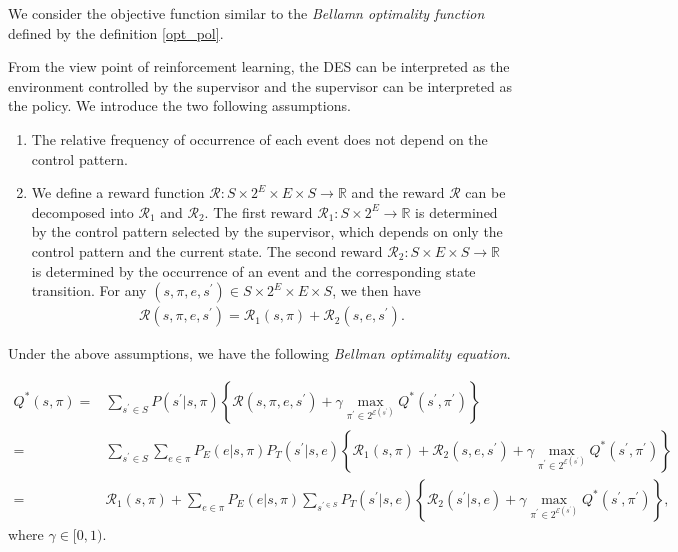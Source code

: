\documentclass[a4j,12pt,oneside,openany,english,dvipdfmx]{jsbook}
\begin{document}
We consider the objective function similar to the {\it Bellamn optimality function} defined by the definition \ref{opt_pol}.
\begin{definition}

  From the view point of reinforcement learning, the DES can be interpreted as the environment controlled by the supervisor and the supervisor can be interpreted as the policy. We introduce the two following assumptions.

  \begin{enumerate}
    \item The relative frequency of occurrence of each event does not depend on the control pattern.
    \item We define a reward function $\mathcal{R} : S \times 2^E \times E \times S \rightarrow \mathbb{R}$ and the reward $\mathcal{R}$ can be decomposed into $\mathcal{R}_1$ and $\mathcal{R}_2$. The first reward $\mathcal{R}_1 : S \times 2^E \rightarrow \mathbb{R}$ is determined by the control pattern selected by the supervisor, which depends on only the control pattern and the current state. The second reward $\mathcal{R}_2 : S \times E \times S \rightarrow \mathbb{R}$ is determined by the occurrence of an event and the corresponding state transition. For any $(s,\pi,e,s^{\prime}) \in S \times 2^E \times E \times S$, we then have
    \begin{align}
      \mathcal{R}(s,\pi,e,s^{\prime}) = \mathcal{R}_1(s,\pi) + \mathcal{R}_2(s,e,s^{\prime}).
    \end{align}
  \end{enumerate}
  Under the above assumptions, we have the following {\it Bellman optimality equation}.

  \begin{align}
    Q^{\ast}(s,\pi) = & \sum_{s^{\prime} \in S} P(s^{\prime}|s,\pi)\left \{ \mathcal{R}(s,\pi,e,s^{\prime}) + \gamma \max_{\pi^{\prime} \in 2^{\mathcal{E}(s^{\prime})}} Q^{\ast}(s^{\prime},\pi^{\prime}) \right \} \nonumber \\
    = & \sum_{s^{\prime} \in S} \sum_{e \in \pi} P_E(e|s,\pi) P_T(s^{\prime}|s,e) \left \{ \mathcal{R}_1(s,\pi) + \mathcal{R}_2(s,e,s^{\prime}) + \gamma \max_{\pi^{\prime} \in 2^{\mathcal{E}(s^{\prime})}} Q^{\ast}(s^{\prime},\pi^{\prime}) \right \} \nonumber \\
    = & \mathcal{R}_1(s,\pi) + \sum_{e \in \pi} P_E(e|s,\pi) \sum_{s^{\prime \in S}} P_T(s^{\prime}|s,e) \left \{ \mathcal{R}_2(s^{\prime}|s,e) + \gamma \max_{\pi^{\prime} \in 2^{\mathcal{E}(s^{\prime})}} Q^{\ast}(s^{\prime}, \pi^{\prime}) \right \},
  \end{align}
  where $\gamma \in [0,1)$.


\end{definition}
\end{document}
